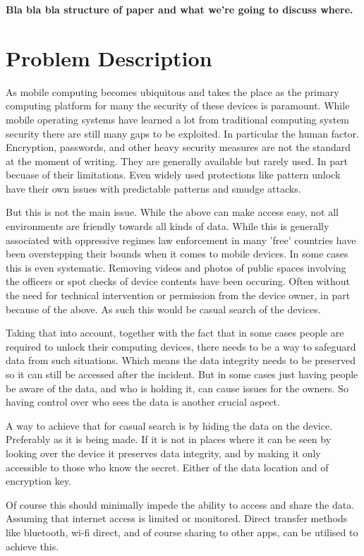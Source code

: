 \documentclass[twocolumn,english,compsoc,journal]{IEEEtran}
\begin{document}
\textbf{Bla bla bla structure of paper and what we're going to discuss
where.}


\section{Problem Description}

As mobile computing becomes ubiquitous and takes the place as the primary
computing platform for many the security of these devices is paramount.
While mobile operating systems have learned a lot from traditional computing
system security there are still many gaps to be exploited. In particular the
human factor. Encryption, passwords, and other heavy security measures are 
not the standard at the moment of writing. They are generally available but
rarely used. In part becuase of their limitations. Even widely used protections
like pattern unlock have their own issues with predictable patterns and smudge
attacks.

But this is not the main issue. While the above can make access easy, not all
environments are friendly towards all kinds of data. While this is generally
associated with oppressive regimes law enforcement in many 'free' countries
have been overstepping their bounds when it comes to mobile devices. In
some cases this is even systematic. Removing videos and photos of public 
spaces involving the officers or spot checks of device contents have been
occuring. Often without the need for technical intervention or permission
from the device owner, in part because of the above. As such this would be
casual search of the devices.

Taking that into account, together with the fact that in some cases people
are required to unlock their computing devices, there needs to be a way to
safeguard data from such situations. Which means the data integrity needs
to be preserved so it can still be accessed after the incident. But in some
cases just having people be aware of the data, and who is holding it, can
cause issues for the owners. So having control over who sees the data is
another crucial aspect.

A way to achieve that for casual search is by hiding the data on the device.
Preferably as it is being made. If it is not in places where it can be seen
by looking over the device it preserves data integrity, and by making it
only accessible to those who know the secret. Either of the data location
and of encryption key.

Of course this should minimally impede the ability to access and share the
data. Assuming that internet access is limited or monitored. Direct transfer
methods like bluetooth, wi-fi direct, and of course sharing to other apps,
can be utilised to achieve this.
\end{document}
